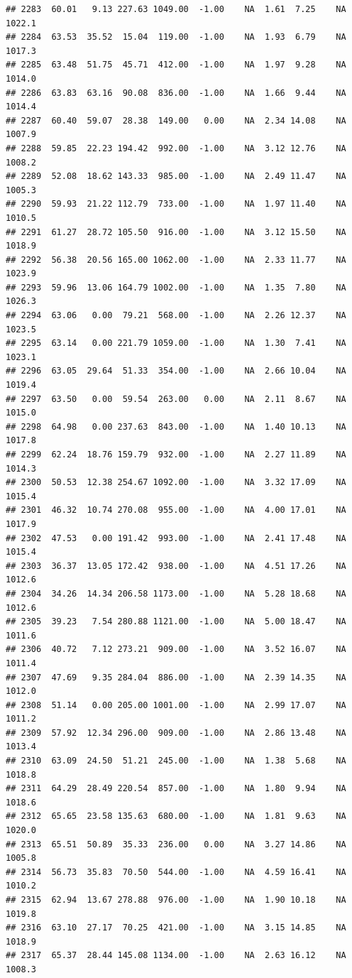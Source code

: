 \documentclass{article}\usepackage{graphicx, color}
\makeatletter
\newenvironment{kframe}{%
 \def\at@end@of@kframe{}%
 \ifinner\ifhmode%
  \def\at@end@of@kframe{\end{minipage}}%
  \begin{minipage}{\columnwidth}%
 \fi\fi%
 \def\FrameCommand##1{\hskip\@totalleftmargin \hskip-\fboxsep
 \colorbox{shadecolor}{##1}\hskip-\fboxsep
     \hskip-\linewidth \hskip-\@totalleftmargin \hskip\columnwidth}%
 \MakeFramed {\advance\hsize-\width
   \@totalleftmargin\z@ \linewidth\hsize
   \@setminipage}}%
 {\par\unskip\endMakeFramed%
 \at@end@of@kframe}
\newenvironment{knitrout}{}{} %
\makeatother
\begin{document}
\begin{knitrout}
\begin{kframe}
\begin{verbatim}
## 2283  60.01   9.13 227.63 1049.00  -1.00    NA  1.61  7.25    NA 1022.1
## 2284  63.53  35.52  15.04  119.00  -1.00    NA  1.93  6.79    NA 1017.3
## 2285  63.48  51.75  45.71  412.00  -1.00    NA  1.97  9.28    NA 1014.0
## 2286  63.83  63.16  90.08  836.00  -1.00    NA  1.66  9.44    NA 1014.4
## 2287  60.40  59.07  28.38  149.00   0.00    NA  2.34 14.08    NA 1007.9
## 2288  59.85  22.23 194.42  992.00  -1.00    NA  3.12 12.76    NA 1008.2
## 2289  52.08  18.62 143.33  985.00  -1.00    NA  2.49 11.47    NA 1005.3
## 2290  59.93  21.22 112.79  733.00  -1.00    NA  1.97 11.40    NA 1010.5
## 2291  61.27  28.72 105.50  916.00  -1.00    NA  3.12 15.50    NA 1018.9
## 2292  56.38  20.56 165.00 1062.00  -1.00    NA  2.33 11.77    NA 1023.9
## 2293  59.96  13.06 164.79 1002.00  -1.00    NA  1.35  7.80    NA 1026.3
## 2294  63.06   0.00  79.21  568.00  -1.00    NA  2.26 12.37    NA 1023.5
## 2295  63.14   0.00 221.79 1059.00  -1.00    NA  1.30  7.41    NA 1023.1
## 2296  63.05  29.64  51.33  354.00  -1.00    NA  2.66 10.04    NA 1019.4
## 2297  63.50   0.00  59.54  263.00   0.00    NA  2.11  8.67    NA 1015.0
## 2298  64.98   0.00 237.63  843.00  -1.00    NA  1.40 10.13    NA 1017.8
## 2299  62.24  18.76 159.79  932.00  -1.00    NA  2.27 11.89    NA 1014.3
## 2300  50.53  12.38 254.67 1092.00  -1.00    NA  3.32 17.09    NA 1015.4
## 2301  46.32  10.74 270.08  955.00  -1.00    NA  4.00 17.01    NA 1017.9
## 2302  47.53   0.00 191.42  993.00  -1.00    NA  2.41 17.48    NA 1015.4
## 2303  36.37  13.05 172.42  938.00  -1.00    NA  4.51 17.26    NA 1012.6
## 2304  34.26  14.34 206.58 1173.00  -1.00    NA  5.28 18.68    NA 1012.6
## 2305  39.23   7.54 280.88 1121.00  -1.00    NA  5.00 18.47    NA 1011.6
## 2306  40.72   7.12 273.21  909.00  -1.00    NA  3.52 16.07    NA 1011.4
## 2307  47.69   9.35 284.04  886.00  -1.00    NA  2.39 14.35    NA 1012.0
## 2308  51.14   0.00 205.00 1001.00  -1.00    NA  2.99 17.07    NA 1011.2
## 2309  57.92  12.34 296.00  909.00  -1.00    NA  2.86 13.48    NA 1013.4
## 2310  63.09  24.50  51.21  245.00  -1.00    NA  1.38  5.68    NA 1018.8
## 2311  64.29  28.49 220.54  857.00  -1.00    NA  1.80  9.94    NA 1018.6
## 2312  65.65  23.58 135.63  680.00  -1.00    NA  1.81  9.63    NA 1020.0
## 2313  65.51  50.89  35.33  236.00   0.00    NA  3.27 14.86    NA 1005.8
## 2314  56.73  35.83  70.50  544.00  -1.00    NA  4.59 16.41    NA 1010.2
## 2315  62.94  13.67 278.88  976.00  -1.00    NA  1.90 10.18    NA 1019.8
## 2316  63.10  27.17  70.25  421.00  -1.00    NA  3.15 14.85    NA 1018.9
## 2317  65.37  28.44 145.08 1134.00  -1.00    NA  2.63 16.12    NA 1008.3

\end{verbatim}
\end{kframe}
\end{knitrout}
\end{document}
